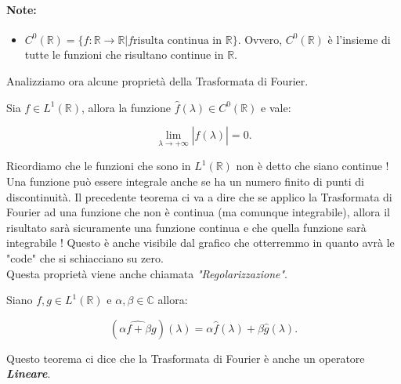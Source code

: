 \paragraph{Note:}
\begin{itemize}
    \item $C^0(\mathbb{R}) = \{ f: \mathbb{R} \rightarrow \mathbb{R} | f \text{
                  risulta continua in } \mathbb{R} \}$. Ovvero, $C^0(\mathbb{R})$ è
          l'insieme di tutte le funzioni che risultano continue in
          $\mathbb{R}$.
\end{itemize}

Analizziamo ora alcune proprietà della Trasformata di Fourier.

\begin{theorem}
    Sia $f \in L^1(\mathbb{R})$, allora la funzione $\hat{f}(\lambda) \in
        C^0(\mathbb{R})$ e vale:
    
    $$
        \lim_{\lambda \rightarrow +\infty} \left| \hat{f}(\lambda) \right| = 0.
    $$
\end{theorem}

Ricordiamo che le funzioni che sono in $L^1(\mathbb{R})$ non è detto che siano
continue ! Una funzione può essere integrale anche se ha un numero finito di
punti di discontinuità. Il precedente teorema ci va a dire che se applico la
Trasformata di Fourier ad una funzione che non è continua (ma comunque
integrabile), allora il risultato sarà sicuramente una funzione continua e
che quella funzione sarà integrabile ! Questo è anche visibile dal grafico che
otterremmo in quanto avrà le "code" che si schiacciano su zero.\\
Questa proprietà viene anche chiamata \textit{"Regolarizzazione"}.

\begin{theorem}
    Siano $f, g \in L^1(\mathbb{R})$ e $\alpha, \beta \in \mathbb{C}$ allora:
    
    $$
        (\widehat{ \alpha f + \beta g })(\lambda) = \alpha \hat{f}(\lambda) +
        \beta \hat{g}(\lambda).
    $$
\end{theorem}

Questo teorema ci dice che la Trasformata di Fourier è anche un operatore
\textbf{\textit{Lineare}}.\\

